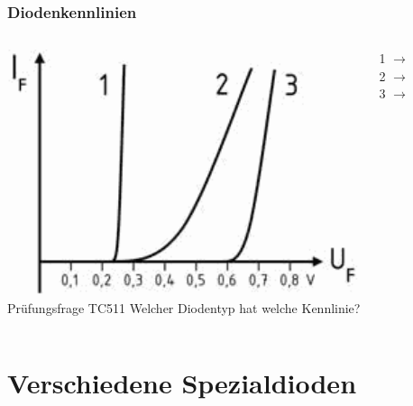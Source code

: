 \begin{frame}
  \frametitle{Diodenkennlinien}
  \begin{columns}[c]
    \includegraphics[width=1\textwidth,height=.85\textheight,keepaspectratio]{a05/tc511.png}\\
    {\tiny Prüfungsfrage TC511}
    Welcher Diodentyp hat welche Kennlinie?
    \begin{description}
      \item[1 $\rightarrow$] 
      \item[2 $\rightarrow$] 
      \item[3 $\rightarrow$] 
    \end{description}
  \end{columns}
\end{frame}

\section*{Verschiedene Spezialdioden}

